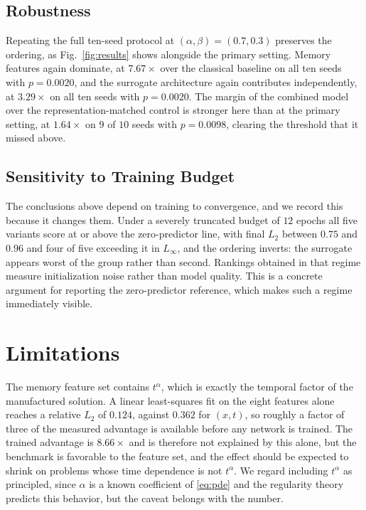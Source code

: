 \documentclass[journal]{IEEEtran}
\begin{document}
\subsection{Robustness}
Repeating the full ten-seed protocol at $(\alpha,\beta)=(0.7,0.3)$ preserves the
ordering, as Fig.~\ref{fig:results} shows alongside the primary setting. Memory
features again dominate, at $7.67\times$ over the classical baseline on all ten
seeds with $p=0.0020$, and the surrogate architecture again contributes
independently, at $3.29\times$ on all ten seeds with $p=0.0020$. The margin of the
combined model over the representation-matched control is stronger here than at
the primary setting, at $1.64\times$ on $9$ of $10$ seeds with $p=0.0098$,
clearing the threshold that it missed above.

\subsection{Sensitivity to Training Budget}
The conclusions above depend on training to convergence, and we record this
because it changes them. Under a severely truncated budget of $12$ epochs all five
variants score at or above the zero-predictor line, with final $L_2$ between
$0.75$ and $0.96$ and four of five exceeding it in $L_\infty$, and the ordering
inverts: the surrogate appears worst of the group rather than second. Rankings
obtained in that regime measure initialization noise rather than model quality.
This is a concrete argument for reporting the zero-predictor reference, which
makes such a regime immediately visible.

\section{Limitations}
The memory feature set contains $t^{\alpha}$, which is exactly the temporal factor
of the manufactured solution. A linear least-squares fit on the eight features
alone reaches a relative $L_2$ of $0.124$, against $0.362$ for $(x,t)$, so roughly
a factor of three of the measured advantage is available before any network is
trained. The trained advantage is $8.66\times$ and is therefore not explained by
this alone, but the benchmark is favorable to the feature set, and the effect
should be expected to shrink on problems whose time dependence is not
$t^{\alpha}$. We regard including $t^{\alpha}$ as principled, since $\alpha$ is a
known coefficient of \eqref{eq:pde} and the regularity theory predicts this
behavior, but the caveat belongs with the number.
\end{document}
